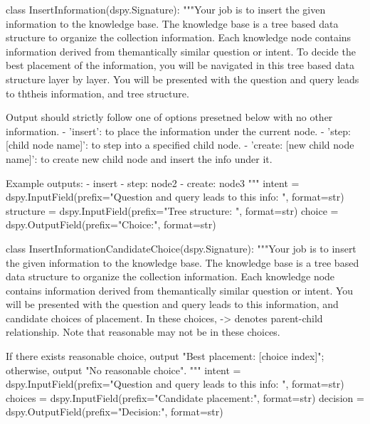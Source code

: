 \begin{prompt}
class InsertInformation(dspy.Signature):
    """Your job is to insert the given information to the knowledge base. The knowledge base is a tree based data structure to organize the collection information. Each knowledge node contains information derived from themantically similar question or intent.
    To decide the best placement of the information, you will be navigated in this tree based data structure layer by layer.
    You will be presented with the question and query leads to ththeis information, and tree structure.
    
    Output should strictly follow one of options presetned below with no other information.
    - 'insert': to place the information under the current node.
    - 'step: [child node name]': to step into a specified child node.
    - 'create: [new child node name]': to create new child node and insert the info under it.

    Example outputs:
    - insert
    - step: node2
    - create: node3
    """
    intent = dspy.InputField(prefix="Question and query leads to this info: ", format=str)
    structure = dspy.InputField(prefix="Tree structure: \n", format=str)
    choice = dspy.OutputField(prefix="Choice:\n", format=str)

class InsertInformationCandidateChoice(dspy.Signature):
    """Your job is to insert the given information to the knowledge base. The knowledge base is a tree based data structure to organize the collection information. Each knowledge node contains information derived from themantically similar question or intent.
    You will be presented with the question and query leads to this information, and candidate choices of placement. In these choices, -> denotes parent-child relationship. Note that reasonable may not be in these choices.
    
    If there exists reasonable choice, output "Best placement: [choice index]"; otherwise, output "No reasonable choice".
    """
    intent = dspy.InputField(prefix="Question and query leads to this info: ", format=str)
    choices = dspy.InputField(prefix="Candidate placement:\n", format=str)
    decision = dspy.OutputField(prefix="Decision:\n", format=str)
    
\end{prompt}